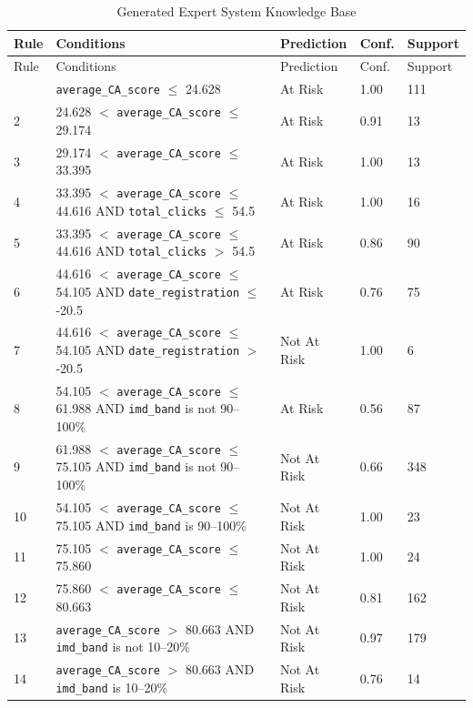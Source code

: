 \begin{small}
\begin{longtable}{p{0.65cm}p{6.9cm}p{2.2cm}p{1.1cm}p{1.2cm}}
\caption{Generated Expert System Knowledge Base}\label{tab:knowledge-base}\\
\toprule
Rule & Conditions & Prediction & Conf. & Support \\
\midrule
\endfirsthead
\toprule
Rule & Conditions & Prediction & Conf. & Support \\
\midrule
\endhead
\bottomrule
\endfoot
1 & \texttt{average\_CA\_score} $\leq$ 24.628 & At Risk & 1.00 & 111 \\
2 & 24.628 $<$ \texttt{average\_CA\_score} $\leq$ 29.174 & At Risk & 0.91 & 13 \\
3 & 29.174 $<$ \texttt{average\_CA\_score} $\leq$ 33.395 & At Risk & 1.00 & 13 \\
4 & 33.395 $<$ \texttt{average\_CA\_score} $\leq$ 44.616 AND \texttt{total\_clicks} $\leq$ 54.5 & At Risk & 1.00 & 16 \\
5 & 33.395 $<$ \texttt{average\_CA\_score} $\leq$ 44.616 AND \texttt{total\_clicks} $>$ 54.5 & At Risk & 0.86 & 90 \\
6 & 44.616 $<$ \texttt{average\_CA\_score} $\leq$ 54.105 AND \texttt{date\_registration} $\leq$ -20.5 & At Risk & 0.76 & 75 \\
7 & 44.616 $<$ \texttt{average\_CA\_score} $\leq$ 54.105 AND \texttt{date\_registration} $>$ -20.5 & Not At Risk & 1.00 & 6 \\
8 & 54.105 $<$ \texttt{average\_CA\_score} $\leq$ 61.988 AND \texttt{imd\_band} is not 90--100\% & At Risk & 0.56 & 87 \\
9 & 61.988 $<$ \texttt{average\_CA\_score} $\leq$ 75.105 AND \texttt{imd\_band} is not 90--100\% & Not At Risk & 0.66 & 348 \\
10 & 54.105 $<$ \texttt{average\_CA\_score} $\leq$ 75.105 AND \texttt{imd\_band} is 90--100\% & Not At Risk & 1.00 & 23 \\
11 & 75.105 $<$ \texttt{average\_CA\_score} $\leq$ 75.860 & Not At Risk & 1.00 & 24 \\
12 & 75.860 $<$ \texttt{average\_CA\_score} $\leq$ 80.663 & Not At Risk & 0.81 & 162 \\
13 & \texttt{average\_CA\_score} $>$ 80.663 AND \texttt{imd\_band} is not 10--20\% & Not At Risk & 0.97 & 179 \\
14 & \texttt{average\_CA\_score} $>$ 80.663 AND \texttt{imd\_band} is 10--20\% & Not At Risk & 0.76 & 14 \\
\end{longtable}
\end{small}
